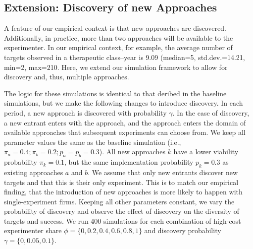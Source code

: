 \subsection{Extension: Discovery of new Approaches}

A feature of our empirical context is that new approaches are discovered. Additionally, in practice, more than two approaches will be available to the experimenter. In our empirical context, for example, the average number of targets observed in a therapeutic class--year is 9.09 (median=5, std.dev.=14.21, min=2, max=210. Here, we extend our simulation framework to allow for discovery and, thus, multiple approaches. 

The logic for these simulations is identical to that deribed in the baseline simulations, but we make the following changes to introduce discovery. In each period, a new approach is discovered with probability $\gamma$. In the case of discovery, a new entrant enters with the approach, and the approach enters the domain of available approaches that subsequent experiments can choose from. We keep all parameter values the same as the baseline simulation (i.e., $\pi_a=0.4; \pi_b=0.2; p_a=p_b=0.3 $). All new approaches $k$ have a lower viability probability $\pi_k = 0.1$, but the same implementation probability $p_k = 0.3$ as existing approaches $a$ and $b$. We assume that only new entrants discover new targets and that this is their only experiment. This is to match our empirical finding, that the introduction of new approaches is more likely to happen with single-experiment firms. Keeping all other parameters constant, we vary the probability of discovery and observe the effect of discovery on the diversity of targets and success. We run 400 simulations for each combination of high-cost experimenter share $\phi = \{0, 0.2, 0.4, 0.6, 0.8, 1\}$ and discovery probability $\gamma = \{0, 0.05, 0.1\}$.

